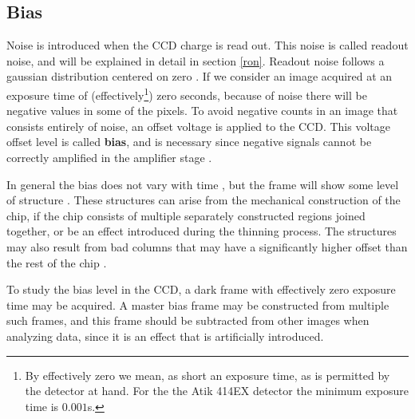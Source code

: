 \documentclass[../main.tex]{subfiles}
\begin{document}
	\subsection{Bias}
	Noise is introduced when the CCD charge is read out. This noise is called readout noise, and will be explained in detail in section \ref{ron}. Readout noise follows a gaussian distribution centered on zero \cite{handbookofccdastronomy, CCDdatareductionguide}. If we consider an image acquired at an exposure time of (effectively\footnote{By effectively zero we mean, as short an exposure time, as is permitted by the detector at hand. For the the Atik 414EX detector the minimum exposure time is $0.001$s.}) zero seconds, because of noise there will be negative values in some of the pixels. To avoid negative counts in an image that consists entirely of noise, an offset voltage is applied to the CCD. This voltage offset level is called \textbf{bias}, and is necessary since negative signals cannot be correctly amplified in the amplifier stage \cite{handbookofccdastronomy, CCDdatareductionguide}.
	
	In general the bias does not vary with time \cite{CCDdatareductionguide}, but the frame will show some level of structure \cite{handbookofccdastronomy}. These structures can arise from the mechanical construction of the chip, if the chip consists of multiple separately constructed regions joined together, or be an effect introduced during the thinning process. The structures may also result from bad columns that may have a significantly higher offset than the rest of the chip \cite{CCDdatareductionguide}. 
	
	To study the bias level in the CCD, a dark frame with effectively zero exposure time may be acquired. A master bias frame may be constructed from multiple such frames, and this frame should be subtracted from other images when analyzing data, since it is an effect that is artificially introduced.
	
\end{document}
